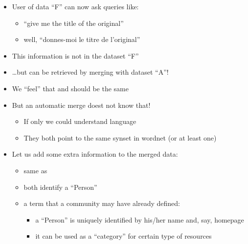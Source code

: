 \documentclass[a4paper,landscape,headrule,footrule,xetex]{foils}
\begin{document}




\begin{itemize}
\item User of data ``F'' can now ask queries like:
  \begin{itemize}
  \item ``give me the title of the original''
  \item  well, ``donnes-moi le titre de l’original''
  \end{itemize}
\item This information is not in the dataset ``F''
\item \ldots but can be retrieved by merging with dataset ``A''!
\end{itemize}



\begin{itemize}
\item We ``feel'' that  and  should be the same
\item But an automatic merge doest not know that!
  \begin{itemize}
  \item If only we could understand language
  \item They both point to the same synset in wordnet (or at least one)
  \end{itemize}
\item Let us add some extra information to the merged data:
  \begin{itemize}
  \item {} same as 
  \item both identify a ``Person''
  \item a term that a community may have already defined:
    \begin{itemize}
    \item a ``Person'' is uniquely identified by his/her name and, say, homepage
    \item it can be used as a ``category'' for certain type of resources
    \end{itemize}
  \end{itemize}
\end{itemize}


\end{document}
